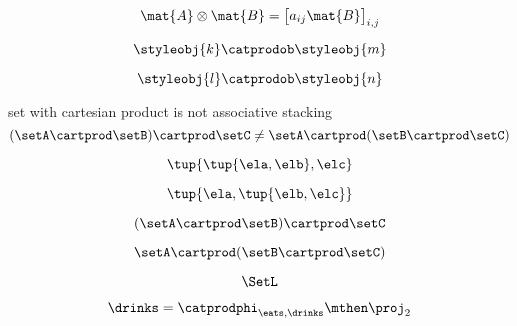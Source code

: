 \begin{forslides}
    \begin{equation}
        \label{eq:parallelism-041}
        \mat{A} \otimes \mat{B} = 
        \begin{bmatrix}
        a_{ij} \mat{B}
        \end{bmatrix}_{i,j}
    \end{equation}

    \begin{equation}
        \label{eq:parallelism-042}
         \styleobj{k} \catprodob \styleobj{m}
    \end{equation}

    \begin{equation}
        \label{eq:parallelism-043}
        \styleobj{l} \catprodob \styleobj{n}
    \end{equation}

set with cartesian product is not associative stacking
    \begin{equation}
        \label{eq:parallelism-044}
        (\setA \cartprod \setB) \cartprod \setC \neq \setA \cartprod (\setB \cartprod \setC)
    \end{equation}

    \begin{equation}
        \label{eq:parallelism-045}
        \tup{\tup{\ela, \elb}, \elc} 
    \end{equation}

    \begin{equation}
        \label{eq:parallelism-046}
        \tup{\ela, \tup{\elb, \elc}} 
    \end{equation}

    \begin{equation}
        \label{eq:parallelism-047}
        (\setA \cartprod \setB) \cartprod \setC
    \end{equation}

    \begin{equation}
        \label{eq:parallelism-048}
        \setA \cartprod (\setB \cartprod \setC)
    \end{equation}

    \begin{equation}
        \label{eq:parallelism-049}
        \SetL
    \end{equation}

    \begin{equation}
        \label{eq:parallelism-050}
        \drinks=\catprodphi_{\eats,\drinks}\mthen \proj_2
    \end{equation}


\end{forslides}
